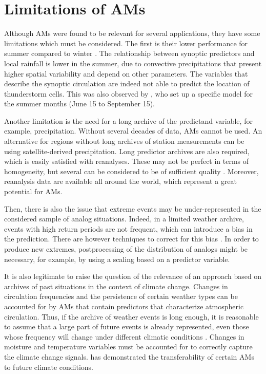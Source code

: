 \documentclass[gmdd]{copernicus}
\begin{document}
\section{Limitations of AMs}
\label{sec:limitations}

Although AMs were found to be relevant for several applications, they have some limitations which must be considered. The first is their lower performance for summer compared to winter \citep{Bliefernicht2010}. The relationship between synoptic predictors and local rainfall is lower in the summer, due to convective precipitations that present higher spatial variability and depend on other parameters. The variables that describe the synoptic circulation are indeed not able to predict the location of thunderstorm cells. This was also observed by \citet{BenDaoud2010}, who set up a specific model for the summer months (June 15 to September 15).

Another limitation is the need for a long archive of the predictand variable, for example, precipitation. Without several decades of data, AMs cannot be used. An alternative for regions without long archives of station measurements can be using satellite-derived precipitation. Long predictor archives are also required, which is easily satisfied with reanalyses. These may not be perfect in terms of homogeneity, but several can be considered to be of sufficient quality \cite{Horton2018b}. Moreover, reanalysis data are available all around the world, which represent a great potential for AMs.

Then, there is also the issue that extreme events may be under-represented in the considered sample of analog situations. Indeed, in a limited weather archive, events with high return periods are not frequent, which can introduce a bias in the prediction. There are however techniques to correct for this bias \citep[see][]{Marty2010}. In order to produce new extremes, postprocessing of the distribution of analogs might be necessary, for example, by using a scaling based on a predictor variable. 

It is also legitimate to raise the question of the relevance of an approach based on archives of past situations in the context of climate change. Changes in circulation frequencies and the persistence of certain weather types \citep{Hewitson1996} can be accounted for by AMs that contain predictors that characterize atmospheric circulation. Thus, if the archive of weather events is long enough, it is reasonable to assume that a large part of future events is already represented, even those whose frequency will change under different climatic conditions \citep{Wetterhall2005}. Changes in moisture and temperature variables must be accounted for to correctly capture the climate change signals. \citet{Dayon2015} has demonstrated the transferability of certain AMs to future climate conditions.
\end{document}
